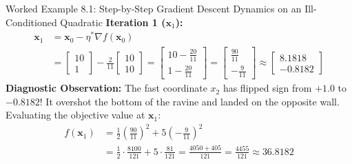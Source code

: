 \begin{examplebox}[breakable]{Worked Example 8.1: Step-by-Step Gradient Descent Dynamics on an Ill-Conditioned Quadratic}
\textbf{Iteration 1 ($\mathbf{x}_1$):}
\begin{align}
\mathbf{x}_1 &= \mathbf{x}_0 - \eta^* \nabla f(\mathbf{x}_0) \nonumber \\
&= \begin{bmatrix} 10 \\ 1 \end{bmatrix} - \frac{2}{11} \begin{bmatrix} 10 \\ 10 \end{bmatrix}
= \begin{bmatrix} 10 - \frac{20}{11} \\ 1 - \frac{20}{11} \end{bmatrix}
= \begin{bmatrix} \frac{90}{11} \\ -\frac{9}{11} \end{bmatrix} \approx \begin{bmatrix} 8.1818 \\ -0.8182 \end{bmatrix}
\end{align}
\textbf{Diagnostic Observation:} The fast coordinate $x_2$ has flipped sign from $+1.0$ to $-0.8182$! It overshot the bottom of the ravine and landed on the opposite wall.
Evaluating the objective value at $\mathbf{x}_1$:
\begin{align}
f(\mathbf{x}_1) &= \frac{1}{2}\left(\frac{90}{11}\right)^2 + 5\left(-\frac{9}{11}\right)^2 \nonumber \\
&= \frac{1}{2} \cdot \frac{8100}{121} + 5 \cdot \frac{81}{121} = \frac{4050 + 405}{121} = \frac{4455}{121} \approx 36.8182
\end{align}


\end{examplebox}

